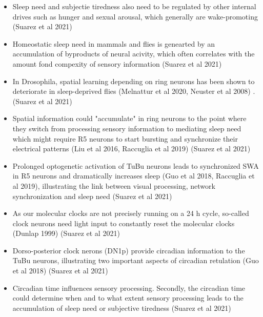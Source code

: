 \documentclass[11pt]{article}
\begin{document}
\begin{itemize}
    \item Sleep need and subjectie tiredness also need to be regulated by other internal drives such as hunger and sexual arousal,
    which generally are wake-promoting \cite{suarez-grimaltNeuralArchitectureSleep2021}
    (Suarez et al 2021)

    \item Homeostatic sleep need in mammals and flies is genearted by an accumulation of byproducts of neural acivity, which often correlates
    with the amount fond compexity of sensory information \cite{suarez-grimaltNeuralArchitectureSleep2021}
    (Suarez et al 2021)

    \item In Drosophila, spatial learning depending on ring neurons has been shown to deteriorate in sleep-deprived flies
    (Melnattur et al 2020, Neuster et al 2008) \cite{suarez-grimaltNeuralArchitectureSleep2021}.
    (Suarez et al 2021)

    \item Spatial information could "accumulate" in ring neurons to the point where they switch from processing sensory information
    to mediating sleep need which might require R5 neurons to start bursting and synchronize their electrical patterns
    (Liu et al 2016, Raccuglia et al 2019) \cite{suarez-grimaltNeuralArchitectureSleep2021}
    (Suarez et al 2021)

    \item Prolonged optogenetic activation of TuBu neurons leads to synchronized SWA in R5 neurons and dramatically increases
    sleep (Guo et al 2018, Raccuglia et al 2019), illustrating the link between visual processing, network synchronization
    and sleep need \cite{suarez-grimaltNeuralArchitectureSleep2021}
    (Suarez et al 2021)

    \item As our molecular clocks are not precisely running on a 24 h cycle, so-called clock neurons need light input to constantly reset the molecular
    clocks (Dunlap 1999) \cite{suarez-grimaltNeuralArchitectureSleep2021}
    (Suarez et al 2021)

    \item Dorso-posterior clock nerons (DN1p) provide circadian information to the TuBu neurons, illustrating two important
    aspects of circadian retulation (Guo et al 2018) \cite{suarez-grimaltNeuralArchitectureSleep2021}
    (Suarez et al 2021)

    \item Circadian time influences sensory processing. Secondly, the circadian time could determine when and to
    what extent sensory processing leads to the accumulation of sleep need or subjective tiredness \cite{suarez-grimaltNeuralArchitectureSleep2021}
    (Suarez et al 2021)


\end{itemize}
\end{document}
